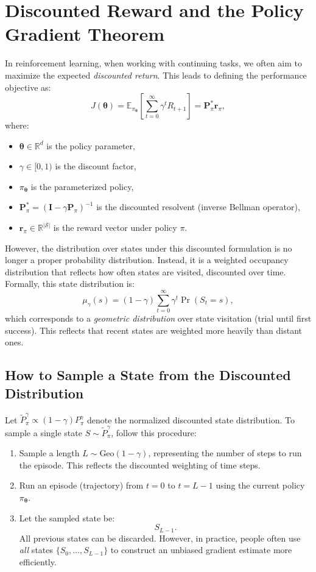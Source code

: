 \section{Discounted Reward and the Policy Gradient Theorem}

In reinforcement learning, when working with continuing tasks, we often aim to maximize the expected \emph{discounted return}. This leads to defining the performance objective as:
\[
J(\boldsymbol{\theta}) = \mathbb{E}_{\pi_{\boldsymbol{\theta}}} \left[ \sum_{t=0}^{\infty} \gamma^t R_{t+1} \right] = \mathbf{P}_\pi^* \mathbf{r}_\pi,
\]
where:
\begin{itemize}
  \item \( \boldsymbol{\theta} \in \mathbb{R}^d \) is the policy parameter,
  \item \( \gamma \in [0,1) \) is the discount factor,
  \item \( \pi_{\boldsymbol{\theta}} \) is the parameterized policy,
  \item \( \mathbf{P}_\pi^* = (\mathbf{I} - \gamma \mathbf{P}_\pi)^{-1} \) is the discounted resolvent (inverse Bellman operator),
  \item \( \mathbf{r}_\pi \in \mathbb{R}^{|\mathcal{S}|} \) is the reward vector under policy \( \pi \).
\end{itemize}

However, the distribution over states under this discounted formulation is no longer a proper probability distribution. Instead, it is a weighted occupancy distribution that reflects how often states are visited, discounted over time. Formally, this state distribution is:
\[
\mu_{\gamma}(s) = (1 - \gamma) \sum_{t=0}^{\infty} \gamma^t \Pr(S_t = s),
\]
which corresponds to a \emph{geometric distribution} over state visitation (trial until first success). This reflects that recent states are weighted more heavily than distant ones.

\subsection{How to Sample a State from the Discounted Distribution}
Let \( \widetilde{P}^{\gamma}_{\pi} \propto (1 - \gamma) P^{\gamma}_{\pi} \) denote the normalized discounted state distribution. To sample a single state \( S \sim \widetilde{P}^{\gamma}_{\pi} \), follow this procedure:
\begin{enumerate}
    \item Sample a length \( L \sim \text{Geo}(1 - \gamma) \), representing the number of steps to run the episode. This reflects the discounted weighting of time steps.
    \item Run an episode (trajectory) from \( t = 0 \) to \( t = L - 1 \) using the current policy \( \pi_{\boldsymbol{\theta}} \).
    \item Let the sampled state be:
    \[
    S_{L-1}.
    \]
    All previous states can be discarded. However, in practice, people often use \emph{all} states \( \{S_0, \dots, S_{L-1}\} \) to construct an unbiased gradient estimate more efficiently.
\end{enumerate}

